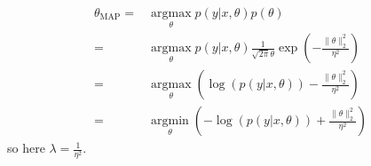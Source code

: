 \begin{answer}
\begin{align*}
\theta_{\text{MAP}}=&\operatorname*{argmax}_{\theta}p(y|x,\theta)p(\theta)\\
= &\operatorname*{argmax}_{\theta}p(y|x,\theta)\frac{1}{\sqrt{2\pi}\theta}\exp(-\frac{\|\theta\|^2_{2}}{\eta^2})\\
= &\operatorname*{argmax}_{\theta}\left( \log(p(y|x,\theta))-\frac{\|\theta\|^2_{2}}{\eta^2}\right) \\
= &\operatorname*{argmin}_{\theta}\left( -\log(p(y|x,\theta))+\frac{\|\theta\|^2_{2}}{\eta^2}\right)
\end{align*}
so here $ \lambda = \frac{1}{\eta^2} $.
\end{answer}
